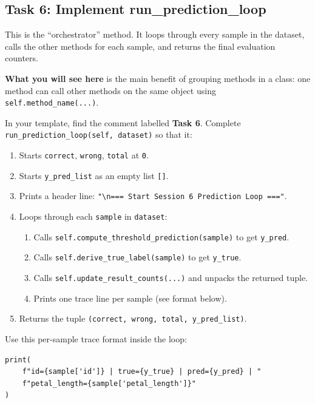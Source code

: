 
\subsection{Task 6: Implement run\_prediction\_loop}

\begin{tcolorbox}[title=Task 6: Implement run\_prediction\_loop]
This is the ``orchestrator'' method.
It loops through every sample in the dataset, calls the other methods for each sample, and returns the final evaluation counters.

\medskip
\noindent
\textbf{What you will see here} is the main benefit of grouping methods in a class:
one method can call other methods on the same object using \texttt{self.method\_name(...)}.

\medskip
\noindent
In your template, find the comment labelled \textbf{Task 6}.
Complete \texttt{run\_prediction\_loop(self, dataset)} so that it:
\begin{enumerate}
    \item Starts \texttt{correct}, \texttt{wrong}, \texttt{total} at \texttt{0}.
    \item Starts \texttt{y\_pred\_list} as an empty list \texttt{[]}.
    \item Prints a header line: \texttt{"\textbackslash n=== Start Session 6 Prediction Loop ==="}.
    \item Loops through each \texttt{sample} in \texttt{dataset}:
    \begin{enumerate}
        \item Calls \texttt{self.compute\_threshold\_prediction(sample)} to get \texttt{y\_pred}.
        \item Calls \texttt{self.derive\_true\_label(sample)} to get \texttt{y\_true}.
        \item Calls \texttt{self.update\_result\_counts(...)} and unpacks the returned tuple.
        \item Prints one trace line per sample (see format below).
    \end{enumerate}
    \item Returns the tuple \texttt{(correct, wrong, total, y\_pred\_list)}.
\end{enumerate}

\medskip
\noindent
Use this per-sample trace format inside the loop:
\begin{verbatim}
print(
    f"id={sample['id']} | true={y_true} | pred={y_pred} | "
    f"petal_length={sample['petal_length']}"
)
\end{verbatim}
\end{tcolorbox}

